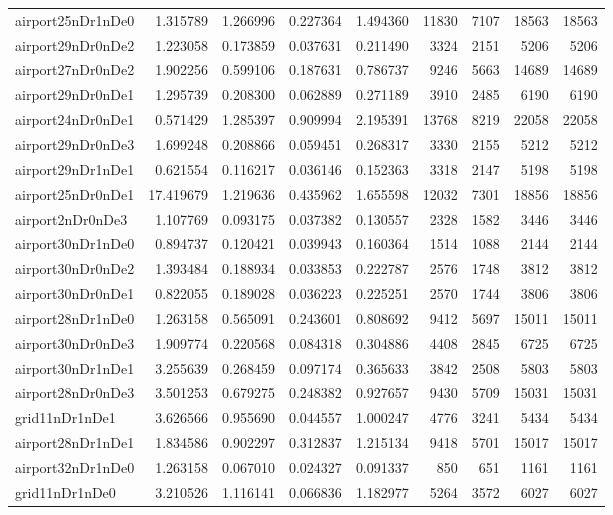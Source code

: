 \begin{longtable}{|l|r|r|r|r|r|r|r|r|}
airport25nDr1nDe0 & 1.315789 & 1.266996 & 0.227364 & 1.494360 & 11830 & 7107 & 18563 & 18563 \\
airport29nDr0nDe2 & 1.223058 & 0.173859 & 0.037631 & 0.211490 & 3324 & 2151 & 5206 & 5206 \\
airport27nDr0nDe2 & 1.902256 & 0.599106 & 0.187631 & 0.786737 & 9246 & 5663 & 14689 & 14689 \\
airport29nDr0nDe1 & 1.295739 & 0.208300 & 0.062889 & 0.271189 & 3910 & 2485 & 6190 & 6190 \\
airport24nDr0nDe1 & 0.571429 & 1.285397 & 0.909994 & 2.195391 & 13768 & 8219 & 22058 & 22058 \\
airport29nDr0nDe3 & 1.699248 & 0.208866 & 0.059451 & 0.268317 & 3330 & 2155 & 5212 & 5212 \\
airport29nDr1nDe1 & 0.621554 & 0.116217 & 0.036146 & 0.152363 & 3318 & 2147 & 5198 & 5198 \\
airport25nDr0nDe1 & 17.419679 & 1.219636 & 0.435962 & 1.655598 & 12032 & 7301 & 18856 & 18856 \\
airport2nDr0nDe3 & 1.107769 & 0.093175 & 0.037382 & 0.130557 & 2328 & 1582 & 3446 & 3446 \\
airport30nDr1nDe0 & 0.894737 & 0.120421 & 0.039943 & 0.160364 & 1514 & 1088 & 2144 & 2144 \\
airport30nDr0nDe2 & 1.393484 & 0.188934 & 0.033853 & 0.222787 & 2576 & 1748 & 3812 & 3812 \\
airport30nDr0nDe1 & 0.822055 & 0.189028 & 0.036223 & 0.225251 & 2570 & 1744 & 3806 & 3806 \\
airport28nDr1nDe0 & 1.263158 & 0.565091 & 0.243601 & 0.808692 & 9412 & 5697 & 15011 & 15011 \\
airport30nDr0nDe3 & 1.909774 & 0.220568 & 0.084318 & 0.304886 & 4408 & 2845 & 6725 & 6725 \\
airport30nDr1nDe1 & 3.255639 & 0.268459 & 0.097174 & 0.365633 & 3842 & 2508 & 5803 & 5803 \\
airport28nDr0nDe3 & 3.501253 & 0.679275 & 0.248382 & 0.927657 & 9430 & 5709 & 15031 & 15031 \\
grid11nDr1nDe1 & 3.626566 & 0.955690 & 0.044557 & 1.000247 & 4776 & 3241 & 5434 & 5434 \\
airport28nDr1nDe1 & 1.834586 & 0.902297 & 0.312837 & 1.215134 & 9418 & 5701 & 15017 & 15017 \\
airport32nDr1nDe0 & 1.263158 & 0.067010 & 0.024327 & 0.091337 & 850 & 651 & 1161 & 1161 \\
grid11nDr1nDe0 & 3.210526 & 1.116141 & 0.066836 & 1.182977 & 5264 & 3572 & 6027 & 6027 \\

\end{longtable}

